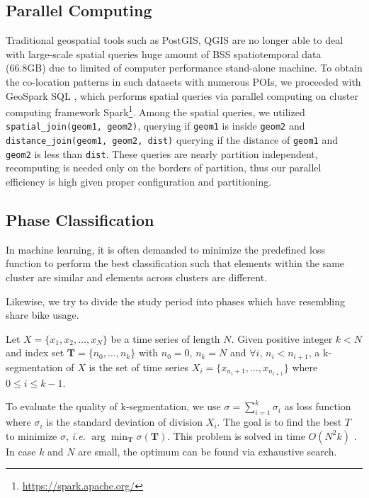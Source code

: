 \documentclass[preprints,ijgi,submit,moreauthors]{Definitions/mdpi}
\begin{document}
\subsection{Parallel Computing}
Traditional geospatial tools such as PostGIS, QGIS are no longer able to deal with large-scale spatial queries huge amount of BSS spatiotemporal data (66.8GB) due to limited of computer performance stand-alone machine.
To obtain the co-location patterns in such datasets with numerous POIs, we proceeded with GeoSpark SQL \cite{huang2017geospark}, which performs spatial queries via parallel computing on cluster computing framework Spark\footnote{\url{https://spark.apache.org/}}.
Among the spatial queries, we utilized \texttt{spatial\_join(geom1, geom2)}, querying if \texttt{geom1} is inside \texttt{geom2} and \texttt{distance\_join(geom1, geom2, dist)} querying if the distance of \texttt{geom1} and \texttt{geom2} is less than \texttt{dist}.
These queries are nearly partition independent, recomputing is needed only on the borders of partition, thus our parallel efficiency is high given proper configuration and partitioning.

\subsection{Phase Classification}\label{sec:phase_classification}
In machine learning, it is often demanded to minimize the predefined loss function to perform the best classification such that elements within the same cluster are similar and elements across clusters are different.

Likewise, we try to divide the study period into phases which have resembling share bike usage.

\begin{Definition}[k-segmentation]
Let $X=\{x_1,x_2,\ldots,x_N\}$ be a time series of length $N$.
Given positive integer $k<N$ and index set $\mathbf{T}=\{n_0,\ldots,n_k\}$ with $n_0=0$, $n_k=N$ and $\forall i$, $n_i<n_{i+1}$, a k-segmentation of $X$ is the set of time series $X_i=\{x_{n_i+1},\ldots,x_{n_{i+1}}\}$ where $0\leq i\leq k-1$.
\end{Definition}

To evaluate the quality of k-segmentation, we use $\sigma=\sum_{i=1}^{k}{\sigma_i}$ as loss function where $\sigma_i$ is the standard deviation of division $X_i$. 
The goal is to find the best $T$ to minimize $\sigma$, \textit{i.e.} $\arg\min_{\mathbf{T}}\sigma(\mathbf{T})$.
This problem is solved in time $O(N^2k)$ \cite{terzi2006efficient}.
In case $k$ and $N$ are small, the optimum can be found via exhaustive search.
\end{document}
